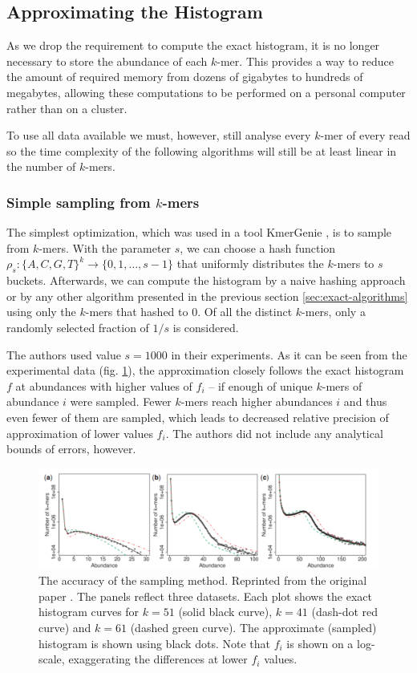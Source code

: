 \subsection{Approximating the Histogram}
As we drop the requirement to compute the exact histogram, it is no longer necessary to
store the abundance of each $k$-mer. This provides a way to reduce the amount of required
memory from dozens of gigabytes to hundreds of megabytes, allowing these computations to
be performed on a personal computer rather than on a cluster.  

To use all data available we must, however, still analyse every $k$-mer of every read so the
time complexity of the following algorithms will still be at least
linear in the number of $k$-mers.

\subsubsection{Simple sampling from $k$-mers}
\label{sec:simple-sampling}
The simplest optimization, which was used in a tool KmerGenie \cite{Chikhi2013},
is to sample from $k$-mers. With the parameter $s$, we can choose a hash function 
$\rho_s: \{A,C,G,T\}^k \rightarrow \{0, 1, \dots, s-1\}$ that uniformly distributes
the $k$-mers to $s$ buckets. Afterwards, we can compute the histogram by a naive
hashing approach or by any other algorithm presented in the previous section
\ref{sec:exact-algorithms} using only the $k$-mers that hashed to 0. 
Of all the distinct $k$-mers, only a randomly selected fraction of $1/s$ is considered.

The authors used value $s=1000$ in their experiments. As it can be seen from the
experimental data (fig. \ref{img:kmergenie-sampling-accuracy}), the approximation closely
follows the exact histogram $f$ at abundances with higher values of $f_i$ -- if enough
of unique $k$-mers of abundance $i$ were sampled. Fewer $k$-mers reach higher abundances
$i$ and thus even fewer of them are sampled, which leads to decreased relative precision
of approximation of lower values $f_i$. The authors did not include 
any analytical bounds of errors, however.

\begin{figure}
\centerline{\includegraphics[width=1.1\textwidth]{images/kmergenie-sampling-accuracy.pdf}}
\caption[Accuracy of KmerGenie Sampling]{The accuracy of the sampling method. 
Reprinted from the original paper \cite{Chikhi2013}. 
The panels reflect three datasets. Each plot shows the exact
histogram curves for $k=51$ (solid black curve), $k=41$ (dash-dot red curve) 
and $k=61$ (dashed green curve). The approximate (sampled) histogram is
shown using black dots. Note that $f_i$ is shown on a log-scale, 
exaggerating the differences at lower $f_i$ values.}
\label{img:kmergenie-sampling-accuracy}
\end{figure}

